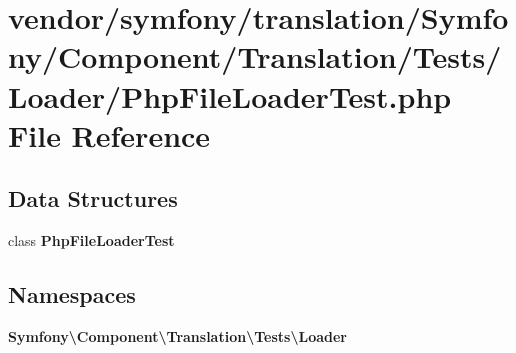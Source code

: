 \section{vendor/symfony/translation/\+Symfony/\+Component/\+Translation/\+Tests/\+Loader/\+Php\+File\+Loader\+Test.php File Reference}
\label{translation_2_symfony_2_component_2_translation_2_tests_2_loader_2_php_file_loader_test_8php}
\subsection*{Data Structures}
\begin{DoxyCompactItemize}
\item 
class {\bf Php\+File\+Loader\+Test}
\end{DoxyCompactItemize}
\subsection*{Namespaces}
\begin{DoxyCompactItemize}
\item 
 {\bf Symfony\textbackslash{}\+Component\textbackslash{}\+Translation\textbackslash{}\+Tests\textbackslash{}\+Loader}
\end{DoxyCompactItemize}
